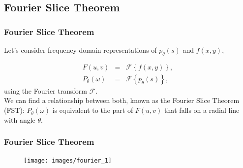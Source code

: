 \subsection{Fourier Slice Theorem}%
\label{sub:ct_fourier}

\begin{frame}
	\frametitle{Fourier Slice Theorem}

	Let's consider frequency domain representations of $p_\theta(s)$ and $f(x, y)$,

	\begin{eqnarray}
		F(u,v) &=& \mathcal{F}\left\{f(x,y)\right\},\\
		P_{\theta}(\omega) &=& \mathcal{F}\left\{p_\theta(s)\right\},
	\end{eqnarray}
	using the Fourier transform $\mathcal{F}$.\\[1cm]

	We can find a relationship between both, known as the Fourier Slice Theorem (FST):
	$P_{\theta}(\omega)$ is equivalent to the part of $F(u,v)$ that falls on a radial line with angle $\theta$.
\end{frame}

\begin{frame}
	\frametitle{Fourier Slice Theorem}

	\begin{figure}[tbp]
		\centering
		\texttt{[image: images/fourier\_1]}
		\label{fig:ct_fourier_1}
	\end{figure}

\end{frame}

